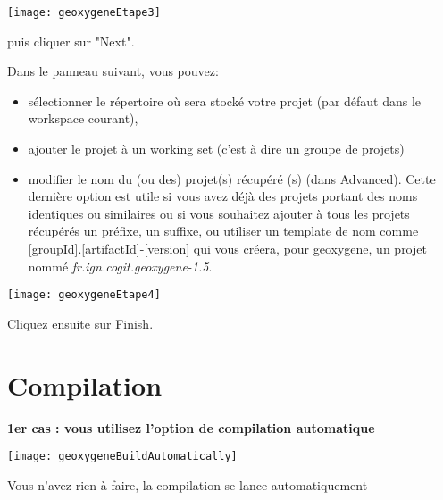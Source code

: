 \begin{center}
\texttt{[image: geoxygeneEtape3]}
\end{center}

\bigskip

\noindent
puis cliquer sur "Next".

\bigskip

\noindent
Dans le panneau suivant, vous pouvez:
\begin{itemize}[label=--, leftmargin=* ,parsep=0cm,itemsep=0cm,topsep=0cm]
\item sélectionner le répertoire où sera stocké votre projet (par défaut dans le workspace courant), 
\item ajouter le projet à un working set (c'est à dire un groupe de projets)
\item modifier le nom du (ou des) projet(s) récupéré (s) (dans Advanced). Cette dernière option est utile si vous avez déjà des projets portant des noms identiques ou similaires ou si vous souhaitez ajouter à tous les projets récupérés un préfixe, un suffixe, ou utiliser un template de nom comme [groupId].[artifactId]-[version] qui vous créera, pour geoxygene, un projet nommé \emph{fr.ign.cogit.geoxygene-1.5}.
\end{itemize}

\begin{center}
\texttt{[image: geoxygeneEtape4]}
\end{center}

\bigskip

\noindent
Cliquez ensuite sur Finish.


\newpage
\section{Compilation}

\begin{flushleft}
    \bf
    1er cas : vous utilisez l'option de compilation automatique
\end{flushleft}

\begin{center}
\texttt{[image: geoxygeneBuildAutomatically]}
\end{center}

\noindent
Vous n'avez rien à faire, la compilation se lance automatiquement


